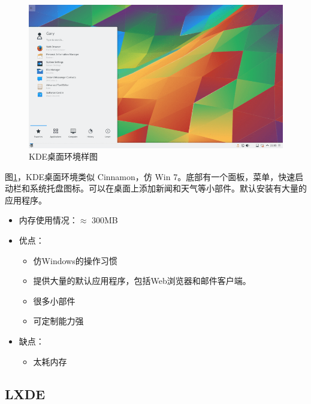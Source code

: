\documentclass[doctor,openright,twoside]{sjtuthesis}
\providecommand{\tightlist}{%
    \setlength{\itemsep}{0pt}\setlength{\parskip}{0pt}}
\theoremstyle{plain}
\theoremstyle{definition}
\theoremstyle{remark}
\theoremstyle{ocrenumbox}
\theoremstyle{plain}
\begin{document}
\begin{figure}
\includegraphics{de-KDE} \caption[KDE桌面环境样图]{KDE桌面环境样图}\label{fig:de-KDE}
\end{figure}

图\ref{fig:de-KDE}，KDE桌面环境类似 Cinnamon，仿 Win 7。底部有一个面板，菜单，快速启动栏和系统托盘图标。可以在桌面上添加新闻和天气等小部件。默认安装有大量的应用程序。

\begin{itemize}
\tightlist
\item
  内存使用情况：\(\approx\) 300MB
\item
  优点：

  \begin{itemize}
  \tightlist
  \item
    仿Windows的操作习惯
  \item
    提供大量的默认应用程序，包括Web浏览器和邮件客户端。
  \item
    很多小部件
  \item
    可定制能力强
  \end{itemize}
\item
  缺点：

  \begin{itemize}
  \tightlist
  \item
    太耗内存
  \end{itemize}
\end{itemize}

\hypertarget{lxde}{%
\subsection{LXDE}\label{lxde}}
\end{document}
